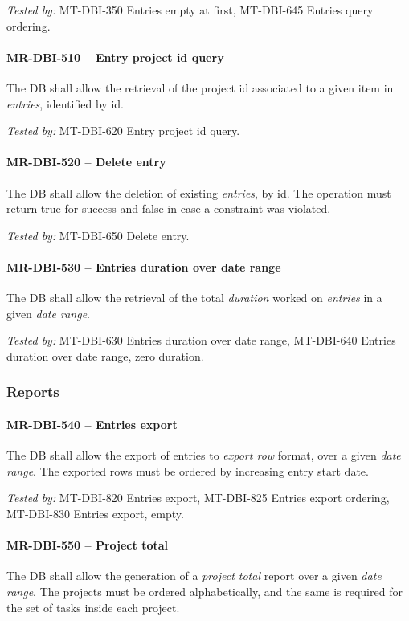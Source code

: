 \textit{Tested by: } MT-DBI-350 Entries empty at first,
MT-DBI-645 Entries query ordering.

\paragraph{MR-DBI-510 -- Entry project id query}
The \gls{DB} shall allow the retrieval of the project id associated to
a given item in \emph{entries}, identified by id.

\textit{Tested by: } MT-DBI-620 Entry project id query.

\paragraph{MR-DBI-520 -- Delete entry}
The \gls{DB} shall allow the deletion of existing \emph{entries}, by id.
The operation must return true for success and false in case a
constraint was violated.

\textit{Tested by: } MT-DBI-650 Delete entry.

\paragraph{MR-DBI-530 -- Entries duration over date range}
The \gls{DB} shall allow the retrieval of the total \emph{duration} worked
on \emph{entries} in a given \emph{date range}.

\textit{Tested by: } MT-DBI-630 Entries duration over date range,
MT-DBI-640 Entries duration over date range, zero duration.

\subsubsection{Reports}
\paragraph{MR-DBI-540 -- Entries export}
The \gls{DB} shall allow the export of entries to \emph{export row} format,
over a given \emph{date range}. The exported rows must be ordered by
increasing entry start date.

\textit{Tested by: } MT-DBI-820 Entries export,
MT-DBI-825 Entries export ordering,
MT-DBI-830 Entries export, empty.

\paragraph{MR-DBI-550 -- Project total}
The \gls{DB} shall allow the generation of a \emph{project total} report
over a given \emph{date range}. The projects must be ordered alphabetically,
and the same is required for the set of tasks inside each project.


